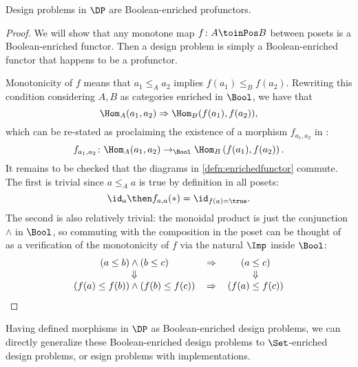 \begin{proposition}
Design problems in $\DP$ are Boolean-enriched profunctors.
\end{proposition}
\begin{proof}
We will show that any monotone map $f\colon A \toinPos B$ between posets is a Boolean-enriched functor. Then a design problem is simply a Boolean-enriched functor that happens to be a profunctor.

Monotonicity of $f$ means that $a_1 \leq_A a_2$ implies $f(a_1) \leq_B f(a_2)$. Rewriting this condition considering $A, B$ as categories enriched in $\Bool$, we have that
\begin{equation}
\Hom_A(a_1, a_2) \Rightarrow \Hom_B(f(a_1), f(a_2)),
\end{equation}
which can be re-stated as proclaiming the existence of a morphism $f_{a_1, a_2}$ in \Bool:
\begin{equation}
f_{a_1, a_2} \colon \Hom_A(a_1, a_2) \to_{\Bool} \Hom_B\left(f(a_1), f(a_2)\right) .
\end{equation}
It remains to be checked that the diagrams in \cref{defn:enrichedfunctor} commute. The first is trivial since $a \leq_A a$ is true by definition in all posets:
\begin{equation}
\id_{a} \then f_{a,a} (\ast) = \id_{f(a) = \true}.
\end{equation}
The second is also relatively trivial: the monoidal product is just the conjunction $\wedge$ in $\Bool$, so commuting with the composition in the poset can be thought of as a verification of the monotonicity of $f$ via the natural $\Imp$ inside $\Bool$:
\begin{equation}
    \begin{tabular}{ccc}
    $(a \leq b) \wedge (b \leq c)$ & $\Rightarrow$ & $(a \leq c)$\\
    $\Downarrow$ & &$\Downarrow$\\
    $(f(a) \leq f(b)) \wedge (f(b) \leq f(c))$&$\Rightarrow$&$(f(a) \leq f(c))$
    \end{tabular}
\end{equation}
\end{proof}

Having defined morphisms in $\DP$ as Boolean-enriched design problems, we can directly generalize these Boolean-enriched design problems to $\Set$-enriched design problems, or esign problems with implementations.

